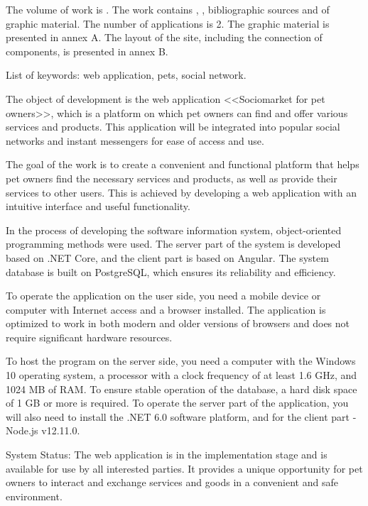   
The volume of work is . The work contains , ,  bibliographic sources and  of graphic material. The number of applications is 2. The graphic material is presented in annex A. The layout of the site, including the connection of components, is presented in annex B.

List of keywords: web application, pets, social network.

The object of development is the web application <<Sociomarket for pet owners>>, which is a platform on which pet owners can find and offer various services and products. This application will be integrated into popular social networks and instant messengers for ease of access and use.

The goal of the work is to create a convenient and functional platform that helps pet owners find the necessary services and products, as well as provide their services to other users. This is achieved by developing a web application with an intuitive interface and useful functionality.

In the process of developing the software information system, object-oriented programming methods were used. The server part of the system is developed based on .NET Core, and the client part is based on Angular. The system database is built on PostgreSQL, which ensures its reliability and efficiency.

To operate the application on the user side, you need a mobile device or computer with Internet access and a browser installed. The application is optimized to work in both modern and older versions of browsers and does not require significant hardware resources.

To host the program on the server side, you need a computer with the Windows 10 operating system, a processor with a clock frequency of at least 1.6 GHz, and 1024 MB of RAM. To ensure stable operation of the database, a hard disk space of 1 GB or more is required. To operate the server part of the application, you will also need to install the .NET 6.0 software platform, and for the client part -\- Node.js v12.11.0.

System Status: The web application is in the implementation stage and is available for use by all interested parties. It provides a unique opportunity for pet owners to interact and exchange services and goods in a convenient and safe environment.

